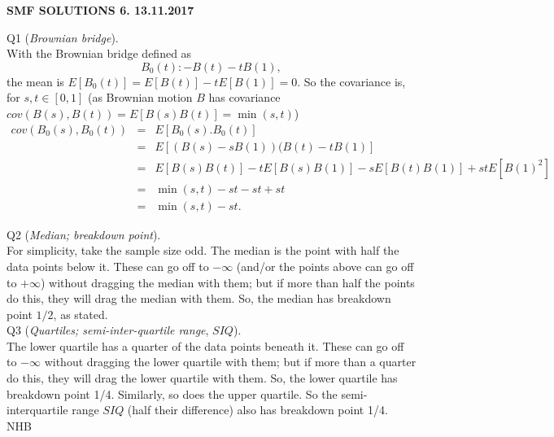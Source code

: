 \documentclass[12pt]{article}
\begin{document}
\def\ni{\noindent}
\def\i{\indent}
\def\a{\alpha}
\def\b{\beta}
\def\e{\epsilon}
\def\d{\delta}
\def\g{\gamma}
\def\qq{\qquad}
\def\q{\quad}
\def\L{\Lambda}
\def\C{\cal C}
\def\E{\cal E}
\def\G{\Gamma}
\def\F{\cal F}
\def\K{\cal K}
\def\O{\cal O}
\def\A{\cal A}
\def\B{\cal B}
\def\S{\cal S}
\def\N{\cal N}
\def\M{\cal M}
\def\P{\cal P}
\def\Om{\Omega}
\def\om{\omega}
\def\s{\sigma}
\def\t{\theta}
\def\z{\zeta}
\def\p{\phi}
\def\m{\mu}
\def\n{\nu}
\def\b{\beta}
\def\e{\epsilon}
\def\l{\lambda}
\def\Si{\Sigma}
\def\half{\frac{1}{2}}
\def\hb{\hfil \break}
\begin{center}
{\bf SMF SOLUTIONS 6.  13.11.2017} \\
\end{center}

\ni Q1 ({\it Brownian bridge}). \\
\i With the Brownian bridge defined as
$$
B_0(t) :- B(t) - t B(1),
$$
the mean is $E[B_0(t)] = E[B(t)] - t E[B(1)] = 0$.  So the covariance is, for $s, t \in [0,1]$    (as Brownian motion $B$ has covariance $cov(B(s), B(t)) = E[B(s)B(t)] = \min (s,t)$)
\begin{eqnarray*}
cov(B_0(s), B_0(t))
&=& E[B_0(s).B_0(t)] \\
&=& E[(B(s) - s B(1))(B(t) - t B(1)] \\
&=& E[B(s) B(t)] - t E[B(s) B(1)] - s E[B(t) B(1)] + st E[B(1)^2] \\
&=& \min (s,t) - st - st + st \\
&=& \min (s,t) - st.
\end{eqnarray*}

\ni Q2 ({\it Median; breakdown point}). \\
\i For simplicity, take the sample size odd.  The median is the point with half the data points below it.  These can go off to $- \infty$ (and/or the points above can go off to $+ \infty$) without dragging the median with them; but if more than half the points do this, they will drag the median with them.  So, the median has breakdown point $1/2$, as stated. \\

\ni Q3 ({\it Quartiles; semi-inter-quartile range}, $SIQ$). \\
\i The lower quartile has a quarter of the data points beneath it.  These can go off to $- \infty$ without dragging the lower quartile with them; but if more than a quarter do this, they will drag the lower quartile with them.  So, the lower quartile has breakdown point 1/4.  Similarly, so does the upper quartile.  So the semi-interquartile range $SIQ$ (half their difference) also has breakdown point 1/4. \\ 

\hfil NHB \break
\end{document}
